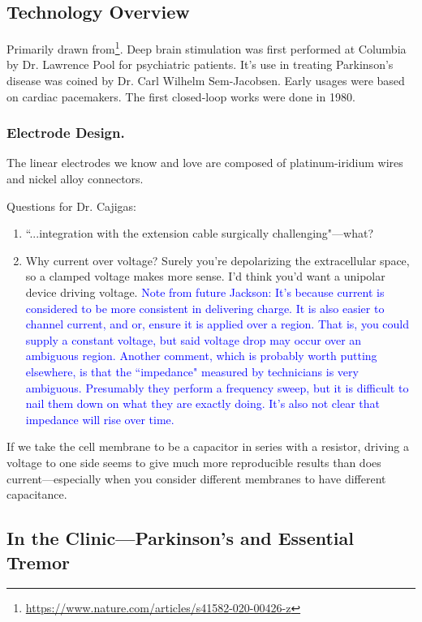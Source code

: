 \subsection{Technology Overview}

Primarily drawn from\footnote{\url{https://www.nature.com/articles/s41582-020-00426-z}}. Deep brain stimulation was first performed at Columbia by Dr. Lawrence Pool for psychiatric patients. It's use in treating Parkinson's disease was coined by Dr. Carl Wilhelm Sem-Jacobsen. Early usages were based on cardiac pacemakers. The first closed-loop works were done in 1980.

\subsubsection{Electrode Design.}

The linear electrodes we know and love are composed of platinum-iridium wires and  nickel alloy connectors. 

\color{red}
Questions for Dr. Cajigas:
\begin{enumerate}
    \itemsep 0em
    \item ``...integration with the extension cable surgically challenging"---what?
    \item Why current over voltage? Surely you're depolarizing the extracellular space, so a clamped voltage makes more sense. I'd think you'd want a unipolar device driving voltage.
    \textcolor{blue}{Note from future Jackson: It's because current is considered to be more consistent in delivering charge. It is also easier to channel current, and or, ensure it is applied over a region. That is, you could supply a constant voltage, but said voltage drop may occur over an ambiguous region. Another comment, which is probably worth putting elsewhere, is that the ``impedance" measured by technicians is very ambiguous. Presumably they perform a frequency sweep, but it is difficult to nail them down on what they are exactly doing. It's also not clear that impedance will rise over time. }
\end{enumerate}
If we take the cell membrane to be a capacitor in series with a resistor, driving a voltage to one side seems to give much more reproducible results than does current---especially when you consider different membranes to have different capacitance. 


\color{black}

\subsection{In the Clinic---Parkinson's and Essential Tremor}


